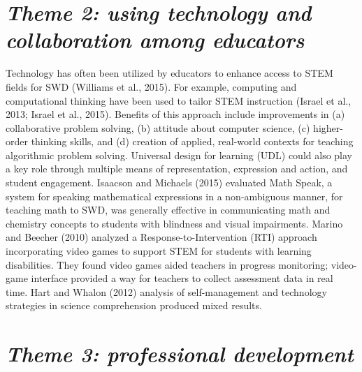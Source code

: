 \documentclass[11pt]{sig-alternate}
\begin{document}
\begin{large}
\section*{\textit{Theme 2: using technology and collaboration among educators}}
 
Technology has often been utilized by educators to enhance access to STEM fields for SWD (Williams et al., 2015). For example, computing and computational thinking have been used to tailor STEM instruction (Israel et al., 2013; Israel et al., 2015). Benefits of this approach include improvements in (a) collaborative problem solving, (b) attitude about computer science, (c) higher-order thinking skills, and (d) creation of applied, real-world contexts for teaching algorithmic problem solving. Universal design for learning (UDL) could also play a key role through multiple means of representation, expression and action, and student engagement. Isaacson and Michaels (2015) evaluated Math Speak, a system for speaking mathematical expressions in a non-ambiguous manner, for teaching math to SWD, was generally effective in communicating math and chemistry concepts to students with blindness and visual impairments. Marino and Beecher (2010) analyzed a Response-to-Intervention (RTI) approach incorporating video games to support STEM for students with learning disabilities. They found video games aided teachers in progress monitoring; video-game interface provided a way for teachers to collect assessment data in real time. Hart and Whalon (2012) analysis of self-management and technology strategies in science comprehension produced mixed results.

\section*{\textit{Theme 3: professional development }}


\end{large}
\end{document}
